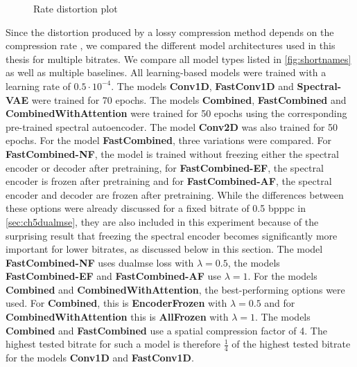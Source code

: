 \begin{figure}[!ht]
\caption{Rate distortion plot}
\label{fig:ratedistortion}
\end{figure}

Since the distortion produced by a lossy compression method depends on the compression rate \citep{berger_rate-distortion_2003}, we compared the different model architectures used in this thesis for multiple bitrates. We compare all model types listed in \autoref{fig:shortnames} as well as multiple baselines. All learning-based models were trained with a learning rate of $0.5\cdot 10^{-4}$. The models \textbf{Conv1D}, \textbf{FastConv1D} and \textbf{Spectral-VAE} were trained for 70 epochs. The models \textbf{Combined}, \textbf{FastCombined} and \textbf{CombinedWithAttention} were trained for 50 epochs using the corresponding pre-trained spectral autoencoder. The model \textbf{Conv2D} was also trained for 50 epochs. For the model \textbf{FastCombined}, three variations were compared. For \textbf{FastCombined-NF}, the model is trained without freezing either the spectral encoder or decoder after pretraining, for \textbf{FastCombined-EF}, the spectral encoder is frozen after pretraining and for \textbf{FastCombined-AF}, the spectral encoder and decoder are frozen after pretraining. While the differences between these options were already discussed for a fixed bitrate of 0.5 bpppc in \autoref{sec:ch5dualmse}, they are also included in this experiment because of the surprising result that freezing the spectral encoder becomes significantly more important for lower bitrates, as discussed below in this section. The model \textbf{FastCombined-NF} uses \ac{dualmse} loss with $\lambda=0.5$, the models \textbf{FastCombined-EF} and \textbf{FastCombined-AF} use $\lambda=1$. For the models \textbf{Combined} and \textbf{CombinedWithAttention}, the best-performing options were used. For \textbf{Combined}, this is \textbf{EncoderFrozen} with $\lambda=0.5$ and for \textbf{CombinedWithAttention} this is \textbf{AllFrozen} with $\lambda=1$. The models \textbf{Combined} and \textbf{FastCombined} use a spatial compression factor of 4. The highest tested bitrate for such a model is therefore $\frac{1}{4}$ of the highest tested bitrate for the models \textbf{Conv1D} and \textbf{FastConv1D}.

